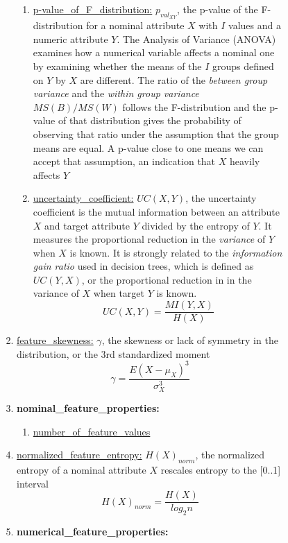 \documentclass[a4paper,12pt, english]{article}
\begin{document}
\begin{enumerate}
\begin{enumerate}
\begin{enumerate}
\begin{enumerate}
\begin{enumerate}
\begin{enumerate}
				\item \underline{p-value\_of\_F\_distribution:} $p_{val_{XY}}$, the p-value of the F-distribution for a nominal attribute $X$ with $I$ values and a numeric attribute $Y$. The Analysis of Variance (ANOVA) examines how a numerical variable affects a nominal one by examining whether the means of the $I$ groups defined on $Y$ by $X$ are different. The ratio of the \emph{between group variance} and the \emph{within group variance} $MS(B)/MS(W)$ follows the F-distribution and the p-value of that distribution gives the probability of observing that ratio under the assumption that the group means are equal. A p-value close to one means we can accept that assumption, an indication that $X$ heavily affects $Y$
				\item \underline{uncertainty\_coefficient:} $UC(X,Y)$, the uncertainty coefficient is the mutual information between an attribute $X$ and target attribute $Y$ divided by the entropy of $Y$. It measures the proportional reduction in the \emph{variance} of $Y$ when $X$ is known. It is strongly related to the \emph{information gain ratio} used in decision trees, which is defined as $UC(Y,X)$, or the proportional reduction in in the variance of $X$ when target $Y$ is known. \begin{equation} UC(X,Y)=\frac{MI(Y,X)}{H(X)} \end{equation}
				\end{enumerate}			
			\item \underline{feature\_skewness:} $\gamma$, the skewness or lack of symmetry in the distribution, or the 3rd standardized moment \begin{equation} \gamma=\frac{E(X-\mu_{X})^{3}}{\sigma_{X}^{3}} \end{equation}
			\item \textbf{nominal\_feature\_properties:}
				\begin{enumerate}
				\item \underline{number\_of\_feature\_values}
				\end{enumerate}			
			\item \underline{normalized\_feature\_entropy:}  $H(X)_{norm}$, the normalized entropy of a nominal attribute $X$ rescales entropy to the [0..1] interval \begin{equation} H(X)_{norm}=\frac{H(X)}{log_{2}n} \end{equation} 
			\item \textbf{numerical\_feature\_properties:}
				\begin{enumerate}

\end{enumerate}
\end{enumerate}
\end{enumerate}
\end{enumerate}
\end{enumerate}
\end{enumerate}
\end{document}
